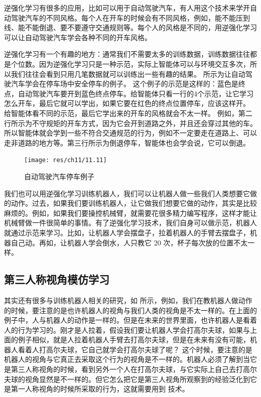 逆强化学习有很多的应用，比如可以用于自动驾驶汽车，有人用这个技术来学开自动驾驶汽车的不同风格。每个人在开车的时候会有不同风格，例如，能不能压到线、能不能倒退、要不要遵守交通规则等。每个人的风格是不同的，用逆强化学习可以让自动驾驶汽车学会各种不同的开车风格。


逆强化学习有一个有趣的地方：通常我们不需要太多的训练数据，训练数据往往都是个位数。因为逆强化学习只是一种示范，实际上智能体可以与环境交互多次，所以我们往往会看到只用几笔数据就可以训练出一些有趣的结果。
 所示为让自动驾驶汽车学会在停车场中安全停车的例子。
这个例子的示范是这样的：蓝色是终点，自动驾驶汽车要开到蓝色终点停车。给智能体只看一行的4个示范，让它学习怎么开车，最后它就可以学出，如果它要在红色的终点位置停车，应该这样开。
给智能体看不同的示范，最后它学出来的开车的风格就会不太一样。
例如，第二行所示为不守规矩的开车方式，因为它会开到道路之外，并且还会穿过其他的车。所以智能体就会学到一些不符合交通规范的行为，例如不一定要走在道路上、可以走非道路的地方等。第三行所示为倒退停车，智能体也会学会说，它可以倒退。

\begin{figure}[htb]
   \centering
   \texttt{[image: res/ch11/11.11]}
   \caption{自动驾驶汽车停车例子}
   \label{fig:fig11.11}
\end{figure}



我们也可以用逆强化学习训练机器人，我们可以让机器人做一些我们人类想要它做的动作。过去，如果我们要训练机器人，让它做我们想要它做的动作，其实是比较麻烦的。例如，如果我们要操控机械臂，就需要花很多精力编写程序，这样才能让机械臂做一件很简单的事情。有了逆强化学习技术，我们自身可以做示范，机器人就通过示范来学习。比如，让机器人学会摆盘子，拉着机器人的手臂去摆盘子，机器自己动。再如，让机器人学会倒水，人只教它 20 次，杯子每次放的位置不太一样。

\subsection{第三人称视角模仿学习} 

其实还有很多与训练机器人相关的研究，如 所示，例如，我们在教机器人做动作的时候，要注意的是也许机器人的视角与我们人类的视角是不太一样的。在上面的例子中，人与机器人的动作是一样的。但是在未来的世界里面，也许机器人是看着人的行为学习的。刚才是人拉着，假设我们要让机器人学会打高尔夫球，如果与上面的例子相似，就是人拉着机器人手臂去打高尔夫球，但是在未来有没有可能，机器人看着人打高尔夫球，它自己就学会打高尔夫球了呢？
这个时候，要注意的是机器人的视角与它真正去采取这个行为的视角是不一样的。机器人必须了解到当它是第三人称视角的时候，看到另外一个人在打高尔夫球，与它实际上自己去打高尔夫球的视角显然是不一样的。但它怎么把它是第三人视角所观察到的经验泛化到它是第一人称视角的时候所采取的行为，这就需要用到 技术。

